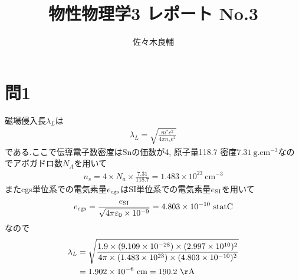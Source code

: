 \documentclass[uplatex,a4j,11pt,dvipdfmx]{jsarticle}
\begin{document}
\title{物性物理学3 レポート No.3}
\author{佐々木良輔}
\date{}
\maketitle
\section*{問1}
磁場侵入長$\lambda_L$は
\begin{align}
  \lambda_L=\sqrt{\frac{m^*c^2}{4\pi n_se^2}}
\end{align}
である.ここで伝導電子数密度はSnの価数が4, 原子量118.7 密度$7.31\ \si{\gram.\centi\metre^{-3}}$なのでアボガドロ数$N_A$を用いて
\begin{align}
  n_s=4\times N_a\times\frac{7.31}{118.7}=1.483\times10^{23}\ \si{\centi\metre^{-3}}
\end{align}
またcgs単位系での電気素量$e_{\rm cgs}$はSI単位系での電気素量$e_{\rm SI}$を用いて
\begin{align}
  e_{\rm cgs}=\frac{e_{\rm SI}}{\sqrt{4\pi\varepsilon_0\times10^{-9}}}=4.803\times10^{-10}\ \si{statC}
\end{align}
なので
\begin{align}
  \begin{split}
    \lambda_L&=\sqrt{\frac{1.9\times(9.109\times10^{-28})\times(2.997\times10^{10})^2}{4\pi\times(1.483\times10^{23})\times(4.803\times10^{-10})^2}}\\
    &=1.902\times10^{-6}\ \si{\centi\metre}=190.2\ {\rm\AA}
  \end{split}
\end{align}
\end{document}
